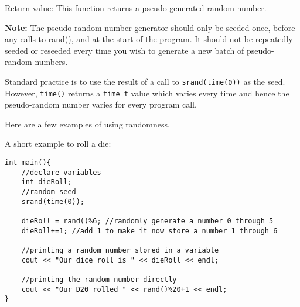 Return value: This function returns a pseudo-generated random number.

\textbf{Note:} The pseudo-random number generator should only be seeded once, before any calls to rand(), and at the start of the program. It should not be repeatedly seeded or reseeded every time you wish to generate a new batch of pseudo-random numbers. 

Standard practice is to use the result of a call to \texttt{srand(time(0))} as the seed. However, \texttt{time()} returns a \texttt{time_t} value which varies every time and hence the pseudo-random number varies for every program call. 

Here are a few examples of using randomness.

\begin{example}
    A short example to roll a die:

    \begin{verbatim}
int main(){
    //declare variables
    int dieRoll;
    //random seed 
    srand(time(0));

    dieRoll = rand()%6; //randomly generate a number 0 through 5
    dieRoll+=1; //add 1 to make it now store a number 1 through 6

    //printing a random number stored in a variable
    cout << "Our dice roll is " << dieRoll << endl; 

    //printing the random number directly
    cout << "Our D20 rolled " << rand()%20+1 << endl; 
}
    \end{verbatim}
\end{example}

